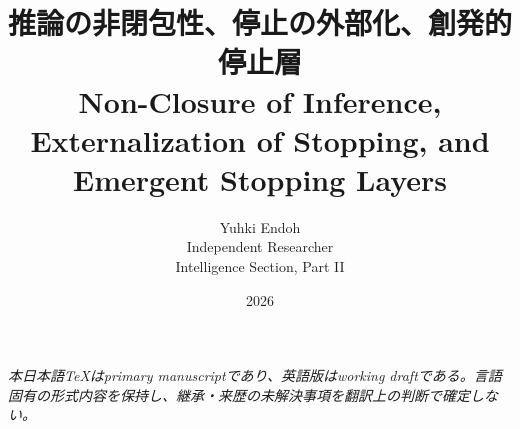 \documentclass[11pt,a4paper]{ltjsarticle}
\title{推論の非閉包性、停止の外部化、創発的停止層\\
{\large Non-Closure of Inference, Externalization of Stopping, and Emergent Stopping Layers}}
\author{Yuhki Endoh\\{\small Independent Researcher}\\{\small Intelligence Section, Part II}}
\date{2026}
\begin{document}
\maketitle

\noindent\textit{本日本語TeXはprimary manuscriptであり、英語版はworking draftである。言語固有の形式内容を保持し、継承・来歴の未解決事項を翻訳上の判断で確定しない。}


\begin{abstract}
\end{abstract}

\setcounter{tocdepth}{2}
\tableofcontents
\clearpage

\setcounter{section}{-1}















\appendix








\end{document}
